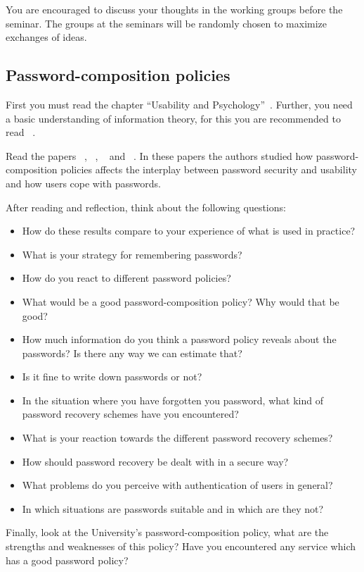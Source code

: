 You are encouraged to discuss your thoughts in the working groups before the 
seminar.
The groups at the seminars will be randomly chosen to maximize exchanges of 
ideas.

\subsection{Password-composition policies}

First you must read the chapter \enquote{Usability and 
  Psychology}~\cite[Ch.~2]{Anderson2008sea}.
Further, you need a basic understanding of information theory, for this you are 
recommended to read ~\cite{Ueltschi2013se}.

Read the papers
~\cite{GuessAgainAndAgain},
~\cite{OfPasswordsAndPeople}, 
~\cite{CanLongPasswordsBeSecureAndUsable} 
and
~\cite{PasswordLifeCycle}.
In these papers the authors studied how password-composition policies affects 
the interplay between password security and usability and how users cope with 
passwords.

After reading and reflection, think about the following questions:
\begin{itemize}
  \item How do these results compare to your experience of what is used in 
    practice?
  \item What is your strategy for remembering passwords?
  \item How do you react to different password policies?
  \item What would be a good password-composition policy?
    Why would that be good?
  \item How much information do you think a password policy reveals about the 
    passwords?
    Is there any way we can estimate that?
  \item Is it fine to write down passwords or not?
  \item In the situation where you have forgotten you password,
  	what kind of password recovery schemes have you encountered?
  \item What is your reaction towards the different password recovery schemes?  
  \item How should password recovery be dealt with in a secure way?
  \item What problems do you perceive with authentication of users in general?
  \item In which situations are passwords suitable and in which are they not?
\end{itemize}
Finally, look at the University's password-composition policy, what are the 
strengths and weaknesses of this policy?
Have you encountered any service which has a good password policy?

